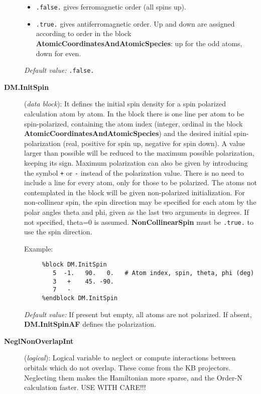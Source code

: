 \documentclass[11pt]{article}
\begin{document}
\begin{description}
\begin{itemize}
\item {\tt .false.} gives ferromagnetic order (all spins up).
\item {\tt .true.} gives antiferromagnetic order. Up and down are
assigned according to order in the block 
{\bf AtomicCoordinatesAndAtomicSpecies}: up for the odd atoms, down for even.
\end{itemize}

{\it Default value:} {\tt .false.}


\item[{\bf DM.InitSpin}] ({\it data block}): 
 It defines the
initial spin density for a spin polarized calculation atom by atom.
In the block there is one line per atom to be spin-polarized, 
containing the atom index (integer, ordinal in the block
{\bf AtomicCoordinatesAndAtomicSpecies}) and the desired
initial spin-polarization (real, positive for spin up, negative for
spin down). A value larger than possible will be reduced
to the maximum possible polarization, keeping its sign. 
Maximum polarization can also be given by introducing the
symbol {\tt +} or {\tt -} instead of the polarization value.
There is no need to include a line for every atom, only for
those to be polarized. The atoms not contemplated in the block will
be given non-polarized initialization.
For non-collinear spin, the spin direction may be specified for
each atom by the polar angles theta and phi, given as the last
two arguments in degrees. If not specified, theta=0 is assumed.
{\bf NonCollinearSpin} must be {\tt .true.} to use the spin direction.

Example:

\begin{verbatim}
     %block DM.InitSpin
        5  -1.   90.   0.   # Atom index, spin, theta, phi (deg)
        3   +    45. -90.
        7   -
     %endblock DM.InitSpin
\end{verbatim}

{\it Default value:} If present but empty, all atoms are not polarized. 
If absent, {\bf DM.InitSpinAF} defines the polarization.


\item[{\bf NeglNonOverlapInt}] ({\it logical}): 
Logical variable to neglect or compute interactions between orbitals
which do not overlap. These come from the KB projectors.
Neglecting them makes the Hamiltonian more sparse, and
the Order-N calculation faster.  USE WITH CARE!!!


\end{description}
\end{document}
